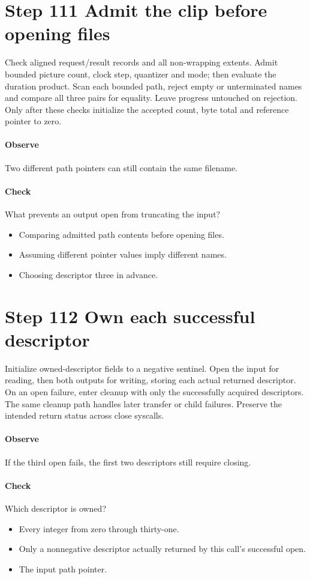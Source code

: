 \section{Step 111 Admit the clip before opening files}\label{h263-clip-s01}
Check aligned request/result records and all non-wrapping extents. Admit bounded
picture count, clock step, quantizer and mode; then evaluate the duration product.
Scan each bounded path, reject empty or unterminated names and compare all three
pairs for equality. Leave progress untouched on rejection. Only after these checks
initialize the accepted count, byte total and reference pointer to zero.

\paragraph{Observe} Two different path pointers can still contain the same filename.
\paragraph{Check} What prevents an output open from truncating the input?
\begin{itemize}
  \item[A.] Comparing admitted path contents before opening files.
  \item[B.] Assuming different pointer values imply different names.
  \item[C.] Choosing descriptor three in advance.
\end{itemize}

\section{Step 112 Own each successful descriptor}\label{h263-clip-s02}
Initialize owned-descriptor fields to a negative sentinel. Open the input for
reading, then both outputs for writing, storing each actual returned descriptor.
On an open failure, enter cleanup with only the successfully acquired descriptors.
The same cleanup path handles later transfer or child failures. Preserve the
intended return status across close syscalls.

\paragraph{Observe} If the third open fails, the first two descriptors still require closing.
\paragraph{Check} Which descriptor is owned?
\begin{itemize}
  \item[A.] Every integer from zero through thirty-one.
  \item[B.] Only a nonnegative descriptor actually returned by this call's successful open.
  \item[C.] The input path pointer.
\end{itemize}

